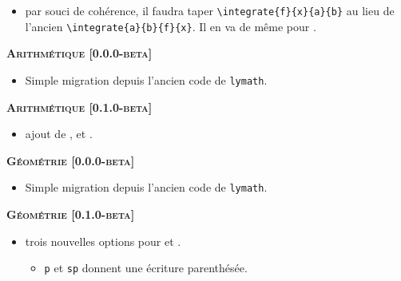 \documentclass[12pt,a4paper]{book}
\begin{document}
\begin{description}
\begin{itemize}[itemsep=.5em]

    

    \item {}
          par souci de cohérence, il faudra taper \verb#\integrate{f}{x}{a}{b}# au lieu de l'ancien \verb#\integrate{a}{b}{f}{x}#.
          Il en va de même pour .


    
\end{itemize}


\separation




\begin{center}
    \textbf{\textsc{Arithmétique [0.0.0-beta]}}
\end{center}

\begin{itemize}[itemsep=.5em]
    \item Simple migration depuis l'ancien code de \verb+lymath+.
\end{itemize}


\begin{center}
    \textbf{\textsc{Arithmétique [0.1.0-beta]}}
\end{center}

\begin{itemize}[itemsep=.5em]
    \item {} ajout de ,  et .
\end{itemize}


\separation




\begin{center}
    \textbf{\textsc{Géométrie [0.0.0-beta]}}
\end{center}

\begin{itemize}[itemsep=.5em]
    \item Simple migration depuis l'ancien code de \verb+lymath+.
\end{itemize}


\begin{center}
    \textbf{\textsc{Géométrie [0.1.0-beta]}}
\end{center}

\begin{itemize}[itemsep=.5em]
    \item {}
          trois nouvelles options pour  et .
    \begin{itemize}[itemsep=.5em]
        \item \verb+p+ et \verb+sp+ donnent une écriture parenthésée.


\end{itemize}
\end{itemize}
\end{description}
\end{document}
